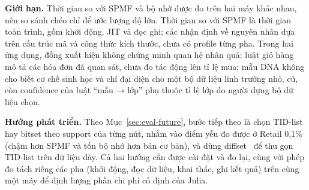 \textbf{Giới hạn.} Thời gian so với SPMF và bộ nhớ được đo trên hai máy khác nhau, nên so sánh chéo chỉ để ước
lượng độ lớn. Thời gian so với SPMF là thời gian toàn trình, gồm khởi động, JIT và đọc ghi; các nhận định về
nguyên nhân dựa trên cấu trúc mã và công thức kích thước, chưa có profile từng pha. Trong hai ứng dụng, đồng xuất
hiện không chứng minh quan hệ nhân quả: luật giỏ hàng mô tả các hóa đơn đã quan sát, chưa đo tác động lên tỉ
lệ mua; mẫu DNA không cho biết cơ chế sinh học và chỉ đại diện cho một bộ dữ liệu linh trưởng nhỏ, cũ, còn
confidence của luật ``mẫu → lớp'' phụ thuộc tỉ lệ lớp do người dựng bộ dữ liệu chọn.

\textbf{Hướng phát triển.} Theo Mục~\ref{sec:eval-future}, bước tiếp theo là chọn TID-list hay bitset theo support
của từng nút, nhắm vào điểm yếu đo được ở Retail 0,1\% (chậm hơn SPMF và tốn bộ nhớ hơn bản cơ bản), và dùng
diffset~\cite{zaki2003fast} để thu gọn TID-list trên dữ liệu dày. Cả hai hướng cần được cài đặt và đo lại, cùng với
phép đo tách riêng các pha (khởi động, đọc dữ liệu, khai thác, ghi kết quả) trên cùng một máy để định lượng phần
chi phí cố định của Julia.
